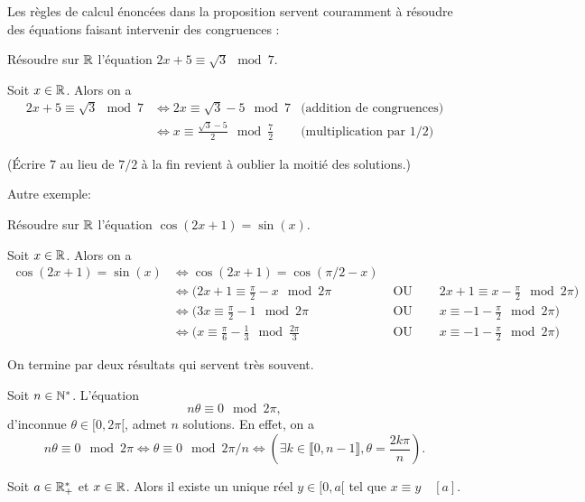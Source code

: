 Les règles de calcul énoncées dans la proposition servent couramment à résoudre des équations faisant intervenir des congruences :
\begin{exercice}
Résoudre sur $\mathbb{R}$ l'équation $2x+5\equiv \sqrt 3 \mod 7$.
\begin{red}
Soit $x\in \mathbb{R}$. Alors on a 
\begin{align*}
2x+5\equiv \sqrt 3 \mod 7 
&\iff 2x\equiv \sqrt 3 - 5 \mod 7  & \text{(addition de congruences)}\\
&\iff x\equiv \frac{\sqrt3-5}{2} \mod{\frac72} &\text{(multiplication par $1/2$)}
\end{align*}
\end{red}
(Écrire $7$ au lieu de $7/2$ à la fin revient à oublier la moitié des solutions.)
\end{exercice}
Autre exemple:
\begin{exercice}
Résoudre sur $\mathbb{R}$ l'équation $\cos(2x+1)=\sin(x)$.
\begin{red}
Soit $x\in \mathbb{R}$. Alors on a 
\begin{align*}
\cos(2x+1)=\sin(x) 
&\iff \cos(2x+1)=\cos(\pi/2-x)  &  & \\
&\iff \bigg( 2x+1\equiv \frac{\pi}{2}-x \mod 2\pi &\text{ OU }\quad &  2x+1\equiv x-\frac{\pi}{2} \mod 2\pi \bigg)  \\
&\iff \bigg( 3x\equiv \frac{\pi}{2}-1 \mod 2\pi &\text{ OU }\quad &  x\equiv -1-\frac{\pi}{2} \mod 2\pi  \bigg) \\
&\iff \bigg( x\equiv \frac{\pi}{6}-\frac13 \mod{\frac{2\pi}{3}} &\text{ OU }\quad &  x\equiv -1-\frac{\pi}{2} \mod 2\pi\bigg) 
\end{align*}
\end{red}
\end{exercice}


On termine par deux résultats qui servent très souvent.

\begin{exemple}
Soit $n \in \mathbb{N}^*$. L'équation 
\[n\theta \equiv 0\mod2\pi,\]
d'inconnue $\theta \in [0,2\pi[$, admet $n$ solutions. En effet, on a 
\[n\theta \equiv 0\mod 2\pi \iff \theta \equiv 0\mod 2\pi/n \iff \left(\exists k \in \llbracket 0,n-1 \rrbracket, \theta = \frac{2k\pi}{n}\right).\]
\end{exemple}




\begin{proposition}
Soit $a\in\mathbb{R}_+^*$ et $x \in \mathbb{R}$.
Alors il existe un unique réel $y \in[0,a[ $ tel que $x \equiv y\quad [a]$.
\end{proposition}

